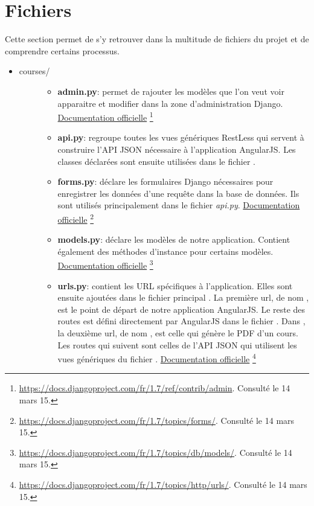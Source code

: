 \documentclass[a4paper,10pt,twoside]{sphinxmanual}
\begin{document}
\section{Fichiers}
\label{guide:fichiers}
Cette section permet de s'y retrouver dans la multitude de fichiers du projet et de comprendre certains processus.
\begin{itemize}
\item {} \begin{description}
\item[{courses/}] \leavevmode\begin{itemize}
\item {} 
\textbf{admin.py}: permet de rajouter les modèles que l'on veut voir apparaitre et modifier dans la zone d'administration Django. \href{https://docs.djangoproject.com/fr/1.7/ref/contrib/admin/}{Documentation officielle} \footnote{
\href{https://docs.djangoproject.com/fr/1.7/ref/contrib/admin}{https://docs.djangoproject.com/fr/1.7/ref/contrib/admin}. Consulté le 14 mars 15.
}

\item {} 
\textbf{api.py}: regroupe toutes les vues génériques RestLess qui servent à construire l'API JSON nécessaire à l'application AngularJS. Les classes déclarées sont ensuite utilisées dans le fichier .

\item {} 
\textbf{forms.py}: déclare les formulaires Django nécessaires pour enregistrer les données d'une requête dans la base de données. Ils sont utilisés principalement dans le fichier \emph{api.py}. \href{https://docs.djangoproject.com/fr/1.7/topics/forms/}{Documentation officielle} \footnote{
\href{https://docs.djangoproject.com/fr/1.7/topics/forms/}{https://docs.djangoproject.com/fr/1.7/topics/forms/}. Consulté le 14 mars 15.
}

\item {} 
\textbf{models.py}: déclare les modèles de notre application. Contient également des méthodes d'instance pour certains modèles. \href{https://docs.djangoproject.com/fr/1.7/topics/db/models/}{Documentation officielle} \footnote{
\href{https://docs.djangoproject.com/fr/1.7/topics/db/models/}{https://docs.djangoproject.com/fr/1.7/topics/db/models/}. Consulté le 14 mars 15.
}

\item {} 
\textbf{urls.py}: contient les URL spécifiques à l'application. Elles sont ensuite ajoutées dans le fichier principal . La première url, de nom , est le point de départ de notre application AngularJS. Le reste des routes est défini directement par AngularJS dans le fichier . Dans , la deuxième url, de nom , est celle qui génère le PDF d'un cours. Les routes qui suivent sont celles de l'API JSON qui utilisent les vues génériques du fichier . \href{https://docs.djangoproject.com/fr/1.7/topics/http/urls/}{Documentation officielle} \footnote{
\href{https://docs.djangoproject.com/fr/1.7/topics/http/urls/}{https://docs.djangoproject.com/fr/1.7/topics/http/urls/}. Consulté le 14 mars 15.
}


\end{itemize}
\end{description}
\end{itemize}
\end{document}
